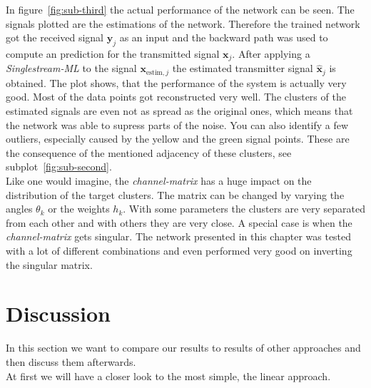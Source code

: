 \documentclass[oneside]{msvreport}%
\newcommand{\B}[1]{\boldsymbol{#1}}
\newcommand{\Bhat}[1]{\boldsymbol{\hat{#1}}}
\newcommand{\e}[1]{\emph{#1}}
\begin{document}
\noindent In figure~\ref{fig:sub-third} the actual performance of the network can be seen. The signals plotted are the estimations of the network. Therefore the trained network got the received signal $\B{y}_j$ as an input and the backward path was used to compute an prediction for the transmitted signal $\B{x}_j$. After applying a \e{Singlestream-ML} to the signal $\B{x}_{\text{estim}, j}$ the estimated transmitter signal $\Bhat{x}_j$ is obtained. The plot shows, that the performance of the system is actually very good. Most of the data points got reconstructed very well. The clusters of the estimated signals are even not as spread as the original ones, which means that the network was able to supress parts of the noise. You can also identify a few outliers, especially caused by the yellow and the green signal points. These are the consequence of the mentioned adjacency of these clusters, see subplot~\ref{fig:sub-second}.\\

\noindent Like one would imagine, the \e{channel-matrix} has a huge impact on the distribution of the target clusters. The matrix can be changed by varying the angles $\theta_k$ or the weights $h_k$. With some parameters the clusters are very separated from each other and with others they are very close. A special case is when the \e{channel-matrix} gets singular. The network presented in this chapter was tested with a lot of different combinations and even performed very good on inverting the singular matrix.

\section{Discussion}
In this section we want to compare our results to results of other approaches and then discuss them afterwards.\\

\noindent At first we will have a closer look to the most simple, the linear approach. 

\begin{center}
\end{center}
\end{document}
